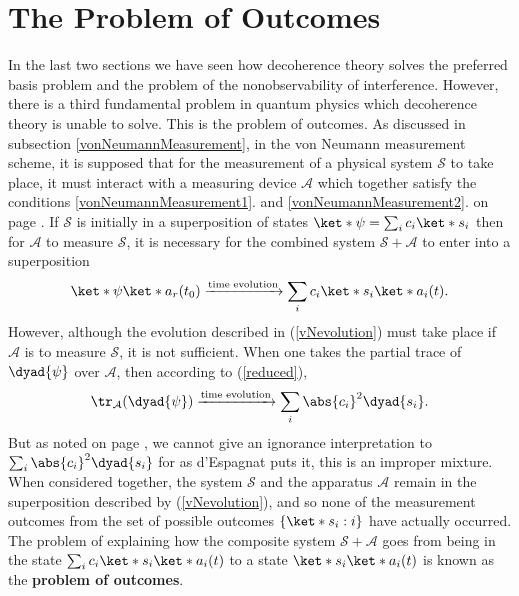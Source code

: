 \documentclass[12pt]{report}
\begin{document}
    
   


    \section{The Problem of Outcomes}\label{probOutcomes}
    In the last two sections we have seen how decoherence theory solves the preferred basis problem and the problem of the nonobservability of interference. However, there is a third fundamental problem in quantum physics which decoherence theory is unable to solve. This is the problem of outcomes. As discussed in subsection \ref{vonNeumannMeasurement}, in the von Neumann measurement scheme, it is supposed that for the measurement of a physical system $\mathcal{S}$ to take place, it must interact with a measuring device $\mathcal{A}$ which together satisfy the conditions \ref{vonNeumannMeasurement1}. and \ref{vonNeumannMeasurement2}. on page \pageref{vonNeumannMeasurement1}. If $\mathcal{S}$ is initially in a superposition of states $\ket*{\psi}=\sum_i c_i\ket*{s_i}$ then for $\mathcal{A}$ to measure $\mathcal{S}$, it is necessary for the combined system $\mathcal{S}+\mathcal{A}$ to enter into a superposition
    \begin{equation}\label{vNevolution}
    \ket*{\psi}\ket*{a_r(t_0)}\xrightarrow{\text{time evolution}}\sum_i c_i\ket*{s_i}\ket*{a_i(t)}.
    \end{equation}
    However, although the evolution described in (\ref{vNevolution}) must take place if $\mathcal{A}$ is to measure $\mathcal{S}$, it is not sufficient. When one takes the partial trace of $\dyad{\psi}$ over $\mathcal{A}$, then according to (\ref{reduced}),
    \begin{equation}\label{vNevolution2}
    \tr_\mathcal{A}(\dyad{\psi})\xrightarrow{\text{time evolution}}\sum_i \abs{c_i}^2\dyad{s_i}.
    \end{equation} 
    But as noted on page \pageref{Espagnat}, we cannot give an ignorance interpretation to $\sum_i \abs{c_i}^2\dyad{s_i}$ for as d'Espagnat puts it, this is an improper mixture. When considered together, the system $\mathcal{S}$ and the apparatus $\mathcal{A}$ remain in the superposition described by (\ref{vNevolution}), and so none of the measurement outcomes from the set of possible outcomes $\{\ket*{s_i}:i\}$ have actually occurred. The problem of explaining how the composite system   $\mathcal{S}+\mathcal{A}$       goes from being in the state $\sum_i c_i\ket*{s_i}\ket*{a_i(t)}$ to a state $\ket*{s_i}\ket*{a_i(t)}$ is known as the \textbf{problem of outcomes}.\label{proboutcomes}  
\end{document}
